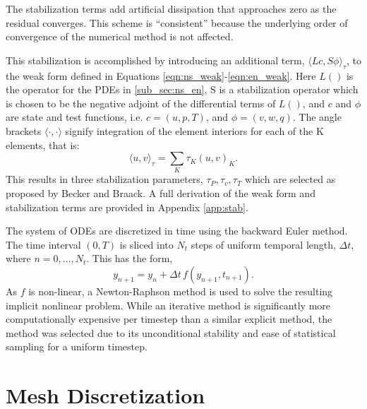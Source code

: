 The
stabilization terms add artificial dissipation that approaches zero as the
residual converges. This scheme is ``consistent'' because the
underlying order of convergence of the numerical method is not 
affected\cite{hughes2000finite}. 

This stabilization is accomplished by introducing an additional term,
$\langle Lc,S\phi \rangle_\tau$, to the weak form defined in Equations
\ref{eqn:ns_weak}-\ref{eqn:en_weak}. Here $L()$ is the operator for the PDEs
in \ref{sub_sec:ns_en}, S is a stabilization operator
which is chosen to be the negative adjoint of the differential terms of
$L()$, and $c$ and $\phi$ are state and test functions, i.e. 
$ c= (u,p,T)$, and $\phi = ( v,w,q )$. 
The angle brackets $\langle \cdot,\cdot \rangle$ signify integration of
the element interiors for each of the K elements, that is:
\begin{equation}
 \langle u,v \rangle_\tau = \sum_K \tau_K(u,v)_K.
\end{equation}
This results in three stabilization parameters, $\tau_P, \tau_v, \tau_T$ 
which are selected as proposed by Becker and Braack. 
A full derivation of the weak form and stabilization terms are provided
in Appendix \ref{app:stab}. 

The system of ODEs are discretized in time using the 
backward Euler method\cite{moin2010fundamentals}. The time interval
$(0,T)$ is sliced into $N_t$ steps of 
uniform temporal length,  $\Delta t$, where $n = 0,\dots,N_t$. 
This has the form, 
\begin{equation}
 y_{n+1} = y_n + \Delta t \, f(y_{n+1},t_{n+1}).
\end{equation}
As $f$ is non-linear, a Newton-Raphson method is used to solve the
resulting implicit nonlinear problem. While an iterative method is
significantly more computationally expensive per timestep than a similar
explicit method, the method was selected due to its unconditional
stability and ease of statistical sampling for a uniform timestep. 


%
%


\section{Mesh Discretization}

